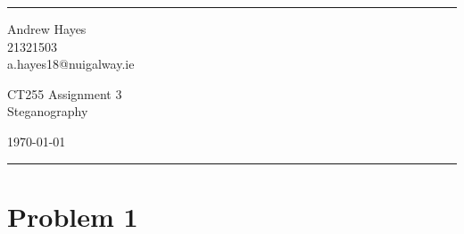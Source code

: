 \documentclass[a4paper]{article}
\begin{document}

\fancyhead[C]{}
\hrule \medskip %
\begin{minipage}{0.295\textwidth} 
\raggedright
\footnotesize
Andrew Hayes \hfill\\   
21321503 \hfill\\
a.hayes18@nuigalway.ie
\end{minipage}
\begin{minipage}{0.4\textwidth} 
\centering 
\large 
CT255 Assignment 3\\ 
\normalsize 
Steganography\\ 
\end{minipage}
\begin{minipage}{0.295\textwidth} 
\raggedleft
\today\hfill\\
\end{minipage}
\medskip\hrule 
\bigskip


\section{Problem 1}
\end{document}
